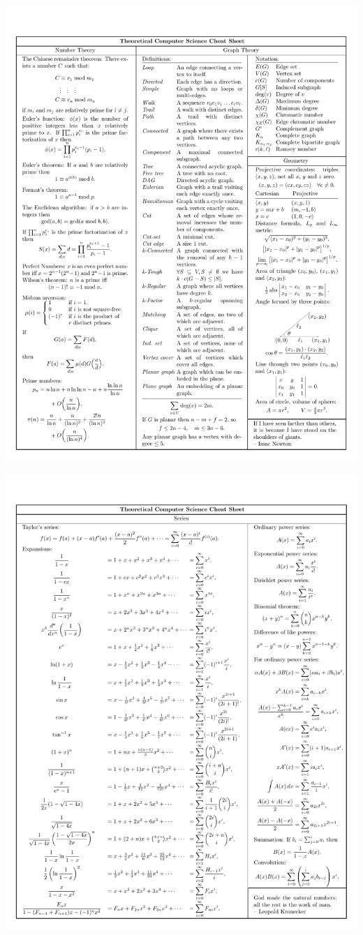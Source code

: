 \documentclass[10pt]{article}
\begin{document}
\centerline{\includegraphics[trim={0 0 0 3cm}, clip, width=\textwidth]{cheatsheet/p05.pdf}}
\centerline{\includegraphics[trim={0 0 0 3cm}, clip, width=\textwidth]{cheatsheet/p09.pdf}}
\end{document}
